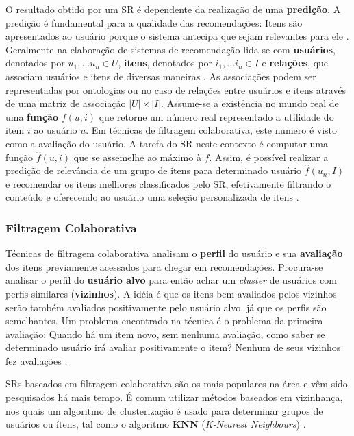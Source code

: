 \documentclass[12pt]{article}
\begin{document}
O resultado obtido por um SR é dependente da realização de uma \textbf{predição}. A predição é fundamental para a qualidade 
das recomendações: Itens são apresentados ao usuário porque  o sistema antecipa que sejam relevantes para ele 
\cite{ricci2011introduction}. Geralmente na elaboração de sistemas de recomendação lida-se com \textbf{usuários}, denotados por 
$ u_1, ... u_n \in U $, \textbf{itens}, denotados por $ i_1, ... i_n \in I$  e \textbf{relações}, que associam usuários e 
itens de diversas maneiras \cite{ekstrand2019recommender}. As associações podem ser representadas por ontologias 
\cite{primo2006tecnicas} ou no caso de relações entre usuários e itens através de uma matriz de associação $ |U| \times |I| $. 
Assume-se a existência no mundo real de uma \textbf{função} $ f (u, i) $ que retorne um número real representado a utilidade do 
item $i$ ao usuário $u$. Em técnicas de filtragem colaborativa, este numero é visto como a avaliação do usuário. A tarefa do SR 
neste contexto é computar uma função $\hat{f}(u, i)$ que se assemelhe ao máximo à $f$. 
Assim, é possível realizar a predição de relevância de um grupo de itens para determinado usuário $\hat{f}(u_n, I)$ e recomendar 
os itens melhores classificados pelo SR, efetivamente filtrando o conteúdo e oferecendo ao usuário uma seleção personalizada de 
itens \cite{ricci2011introduction}.

\subsubsection{Filtragem Colaborativa}

Técnicas de filtragem colaborativa analisam o \textbf{perfil} do usuário e sua \textbf{avaliação} dos itens previamente 
acessados para chegar em recomendações. Procura-se analisar o perfil do \textbf{usuário alvo} para então achar um \textit{cluster} 
de usuários com perfis similares (\textbf{vizinhos}). A idéia é que os itens bem avaliados pelos vizinhos serão também 
avaliados positivamente pelo usuário alvo, já que os perfis são semelhantes. Um problema encontrado na técnica é o problema 
da primeira avaliação: Quando há um item novo, sem nenhuma avaliação, como saber se determinado usuário irá avaliar 
positivamente o item? Nenhum de seus vizinhos fez avaliações \cite{ricci2011introduction}.

SRs baseados em filtragem colaborativa são os mais populares na área e vêm sido pesquisados há mais tempo. \cite{ricci2011introduction} 
É comum utilizar métodos baseados em vizinhança, nos quais um algoritmo de clusterização é usado para determinar grupos 
de usuários ou ítens, tal como o algoritmo \textbf{KNN} (\textit{K-Nearest Neighbours}) \cite{da2018desenvolvimento}.
\end{document}
